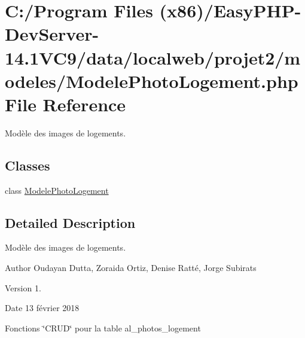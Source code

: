 \hypertarget{_modele_photo_logement_8php}{}\section{C\+:/\+Program Files (x86)/\+Easy\+P\+H\+P-\/\+Dev\+Server-\/14.1\+V\+C9/data/localweb/projet2/modeles/\+Modele\+Photo\+Logement.php File Reference}
\label{_modele_photo_logement_8php}


Modèle des images de logements.  


\subsection*{Classes}
\begin{DoxyCompactItemize}
\item 
class \hyperlink{class_modele_photo_logement}{Modele\+Photo\+Logement}
\end{DoxyCompactItemize}


\subsection{Detailed Description}
Modèle des images de logements. 

\begin{DoxyAuthor}{Author}
Oudayan Dutta, Zoraida Ortiz, Denise Ratté, Jorge Subirats 
\end{DoxyAuthor}
\begin{DoxyVersion}{Version}
1. 
\end{DoxyVersion}
\begin{DoxyDate}{Date}
13 février 2018
\end{DoxyDate}
Fonctions \char`\"{}\+C\+R\+U\+D\char`\"{} pour la table al\+\_\+photos\+\_\+logement 